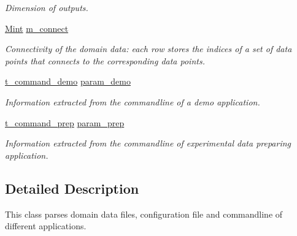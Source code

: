 \begin{DoxyCompactItemize}
\begin{DoxyCompactList}\small\item\em Dimension of outputs. \end{DoxyCompactList}\item 
\hypertarget{classpgpr__parse_a1e1b0be13a510fd547620a8971874407}{\hyperlink{classpgpr__matrix}{Mint} \hyperlink{classpgpr__parse_a1e1b0be13a510fd547620a8971874407}{m\-\_\-connect}}\label{classpgpr__parse_a1e1b0be13a510fd547620a8971874407}

\begin{DoxyCompactList}\small\item\em Connectivity of the domain data\-: each row stores the indices of a set of data points that connects to the corresponding data points. \end{DoxyCompactList}\item 
\hypertarget{classpgpr__parse_ace1bdb63deaf2a5c680613c33cfc625e}{\hyperlink{structt__command__demo}{t\-\_\-command\-\_\-demo} \hyperlink{classpgpr__parse_ace1bdb63deaf2a5c680613c33cfc625e}{param\-\_\-demo}}\label{classpgpr__parse_ace1bdb63deaf2a5c680613c33cfc625e}

\begin{DoxyCompactList}\small\item\em Information extracted from the commandline of a demo application. \end{DoxyCompactList}\item 
\hypertarget{classpgpr__parse_a86c109ef49507a1be375201d0ac4af8e}{\hyperlink{structt__command__prep}{t\-\_\-command\-\_\-prep} \hyperlink{classpgpr__parse_a86c109ef49507a1be375201d0ac4af8e}{param\-\_\-prep}}\label{classpgpr__parse_a86c109ef49507a1be375201d0ac4af8e}

\begin{DoxyCompactList}\small\item\em Information extracted from the commandline of experimental data preparing application. \end{DoxyCompactList}\end{DoxyCompactItemize}


\subsection{Detailed Description}
This class parses domain data files, configuration file and commandline of different applications. 

